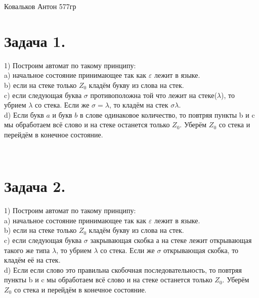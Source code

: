 \documentclass[12pt]{article}
\theoremstyle{definition}
\theoremstyle{definition}
\let\epsilon\varepsilon
\let\eps\varepsilon
\begin{document}
\begin{center} {\LARGE Ковальков Антон 577гр} \end{center}
\section*{Задача  1.}
1) Построим автомат по такому принципу:\\
\hspace*{1cm} a) начальное состояние принимающее так как $\epsilon$ лежит в языке.\\
\hspace*{1cm} b) если на стеке только $Z_0$ кладём букву из слова на стек.\\
\hspace*{1cm} c) если следующая буква $\sigma$ противоположна той что лежит на стеке($\lambda$), то убрием $\lambda$ со стека. Если же $\sigma = \lambda$, то кладём на стек $\sigma\lambda$. \\
\hspace*{1cm} d) Если букв $a$ и букв $b$ в слове одинаковое количество, то повтряя пункты b и c мы обработаем всё слово и на стеке останется только $Z_0$. Уберём $Z_0$ со стека и перейдём в конечное состояние.\\
\\


\section*{Задача  2.}
1) Построим автомат по такому принципу:\\
\hspace*{1cm} a) начальное состояние принимающее так как $\epsilon$ лежит в языке.\\
\hspace*{1cm} b) если на стеке только $Z_0$ кладём букву из слова на стек.\\
\hspace*{1cm} c) если следующая буква $\sigma$ закрывающая скобка а на стеке лежит открывающая такого же типа $\lambda$, то убрием $\lambda$ со стека. Если же $\sigma$ открывающая скобка, то кладём её на стек. \\
\hspace*{1cm} d) Если если слово это правильна скобочная последовательность, то повтряя пункты b и c мы обработаем всё слово и на стеке останется только $Z_0$. Уберём $Z_0$ со стека и перейдём в конечное состояние.\\
\end{document}
